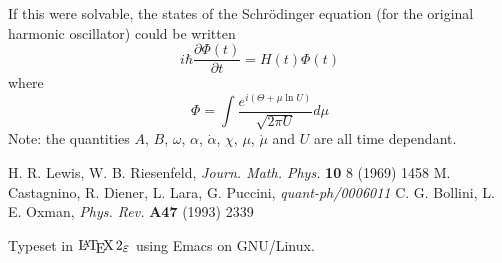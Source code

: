 \documentclass[11pt, a4paper, titlepage]{article}
\newcommand{\pd}{\partial}
\newcommand{\lb}{\left(}
\newcommand{\rb}{\right)}
\begin{document}
If this were solvable, the states of the Schr\"{o}dinger equation (for
the original harmonic oscillator) could be written 
\begin{equation}
  \label{eqn_scheqn}
          i\hbar \frac{\pd \Phi(t)}{\pd t} = H(t) \Phi(t)
\end{equation}
where
\begin{equation}
  \label{eqn_schsol}
          \Phi = \int \frac{e^{i \lb \Theta +\mu \ln U \rb}}{\sqrt{2 \pi U}} d\mu
\end{equation}
Note: the quantities $A$, $B$, $\omega$, $\alpha$, $\dot{\alpha}$,
$\chi$, $\mu$, $\dot{\mu}$ and $U$ are all time dependant.

\begin{thebibliography}{100}
         H. R. Lewis, W. B. Riesenfeld, {\it
        Journ. Math. Phys.} {\bf 10} 8 (1969) 1458
         M. Castagnino, R. Diener, L. Lara,
        G. Puccini, {\it quant-ph/0006011}
         C. G. Bollini, L. E. Oxman, {\it
        Phys. Rev.} {\bf A47} (1993) 2339
\end{thebibliography}
Typeset in $\LaTeXe$ using Emacs on GNU/Linux.
\end{document}
